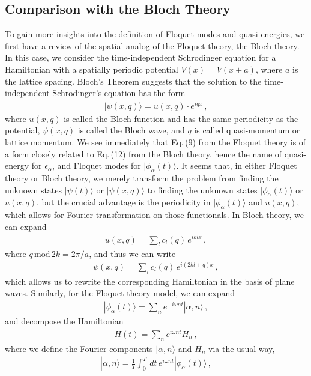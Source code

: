 \documentclass[reprint, amsmath, amssymb, aps]{revtex4-2}
\begin{document}
\subsection{Comparison with the Bloch Theory}
To gain more insights into the definition of Floquet modes and quasi-energies, we first have a review of the spatial analog of the Floquet theory, the Bloch theory. In this case, we consider the time-independent Schrodinger equation for a Hamiltonian with a spatially periodic potential $V(x) = V(x+a)$, where $a$ is the lattice spacing. Bloch's Theorem suggests that the solution to the time-independent Schrodinger's equation has the form
\begin{align}
|\psi (x,q) \rangle = u(x,q) \cdot e^{iqx}\,,
\end{align}
where $u(x,q)$ is called the Bloch function and has the same periodicity as the potential, $\psi(x,q)$ is called the Bloch wave, and $q$ is called
quasi-momentum or lattice momentum. We see immediately that Eq.\,(9) from the Floquet theory is of a form closely related to Eq.\,(12) from the Bloch theory, hence the name of quasi-energy for $\epsilon_\alpha$, and Floquet modes for $|\phi_\alpha (t)\rangle$. It seems that, in either Floquet theory or Bloch theory, we merely transform the problem from finding the unknown states $|\psi(t)\rangle$ or $|\psi(x,q)\rangle$ to finding the unknown states $|\phi_\alpha(t)\rangle$ or $u(x,q)$, but the crucial advantage is the periodicity in $|\phi_\alpha(t)\rangle$ and $u(x,q)$, which allows for Fourier transformation on those functionals. In Bloch theory, we can expand
\begin{align}
u(x,q) = \sum_{l} c_l(q)\, e^{iklx}\,,
\end{align}
where $q\,\text{mod}\,2k = 2\pi/a$, and thus we can write
\begin{align}
\psi(x,q) = \sum_l c_l(q)\, e^{i(2kl+q)x}\,,
\end{align}
which allows us to rewrite the corresponding Hamiltonian in the basis of plane waves. Similarly, for the Floquet theory model, we can expand
\begin{align}
|\phi_\alpha(t)\rangle = \sum_n e^{-i\omega n t} |\alpha, n\rangle\,,
\end{align}
and decompose the Hamiltonian 
\begin{align}
H(t) = \sum_n e^{i\omega n t} H_n\,,
\end{align}
where we define the Fourier components $|\alpha, n\rangle$ and $H_n$ via the usual way,
\begin{align}
|\alpha, n\rangle = \frac{1}{T}\int_0^T \, dt \, e^{i\omega n t}|\phi_\alpha(t)\rangle\,,
\end{align}
\end{document}
